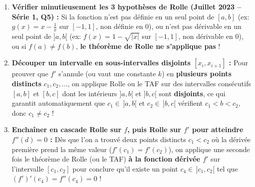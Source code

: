 \begin{astuce}
\begin{enumerate}
    \item \textbf{Vérifier minutieusement les 3 hypothèses de Rolle (Juillet 2023 -- Série 1, Q5) :} Si la fonction n'est pas définie en un seul point de $[a, b]$ (ex: $g(x) = x - \frac{1}{x}$ sur $[-1, 1]$, non définie en $0$), ou n'est pas dérivable en un seul point de $]a, b[$ (ex: $f(x) = 1 - \sqrt{|x|}$ sur $[-1, 1]$, non dérivable en $0$), ou si $f(a) \neq f(b)$, \textbf{le théorème de Rolle ne s'applique pas} !
    \item \textbf{Découper un intervalle en sous-intervalles disjoints $[x_i, x_{i+1}]$ :} Pour prouver que $f'$ s'annule (ou vaut une constante $k$) en \textbf{plusieurs points distincts} $c_1, c_2, \dots$, on applique Rolle ou le TAF sur des intervalles consécutifs $[a, b]$ et $[b, c]$ dont les intérieurs $]a, b[$ et $]b, c[$ sont \textbf{disjoints}, ce qui garantit automatiquement que $c_1 \in \,]a, b[$ et $c_2 \in \,]b, c[$ vérifient $c_1 < b < c_2$, donc $c_1 \neq c_2$ !
    \item \textbf{Enchaîner en cascade Rolle sur $f$, puis Rolle sur $f'$ pour atteindre $f''(d) = 0$ :} Dès que l'on a trouvé deux points distincts $c_1 < c_2$ où la dérivée première prend la même valeur ($f'(c_1) = f'(c_2)$), on applique une seconde fois le théorème de Rolle (ou le TAF) \textbf{à la fonction dérivée $f'$} sur l'intervalle $[c_1, c_2]$ pour conclure qu'il existe un point $c_4 \in \,]c_1, c_2[$ tel que $(f')'(c_4) = f''(c_4) = 0$ !
\end{enumerate}
\end{astuce}

